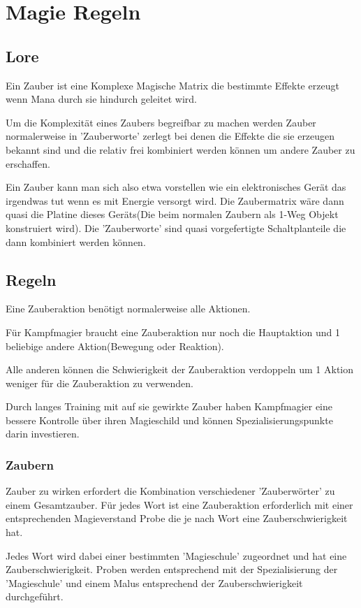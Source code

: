 \chapter{Magie Regeln}
\section{Lore}
Ein Zauber ist eine Komplexe Magische Matrix die bestimmte Effekte erzeugt wenn Mana durch sie hindurch geleitet wird.

Um die Komplexität eines Zaubers begreifbar zu machen werden Zauber normalerweise in 'Zauberworte' zerlegt bei denen die Effekte die sie erzeugen bekannt sind und die relativ frei kombiniert werden können um andere Zauber zu erschaffen.

Ein Zauber kann man sich also etwa vorstellen wie ein elektronisches Gerät das irgendwas tut wenn es mit Energie versorgt wird.
Die Zaubermatrix wäre dann quasi die Platine dieses Geräts(Die beim normalen Zaubern als 1-Weg Objekt konstruiert wird).
Die 'Zauberworte' sind quasi vorgefertigte Schaltplanteile die dann kombiniert werden können.

\section{Regeln}
\label{Kampfmagier}
Eine Zauberaktion benötigt normalerweise alle Aktionen.

Für Kampfmagier braucht eine Zauberaktion nur noch die Hauptaktion und 1 beliebige andere Aktion(Bewegung oder Reaktion).

Alle anderen können die Schwierigkeit der Zauberaktion verdoppeln um 1 Aktion weniger für die Zauberaktion zu verwenden.

Durch langes Training mit auf sie gewirkte Zauber haben Kampfmagier eine bessere Kontrolle über ihren Magieschild und können Spezialisierungspunkte darin investieren.

\subsection{Zaubern}
Zauber zu wirken erfordert die Kombination verschiedener 'Zauberwörter' zu einem Gesamtzauber.
Für jedes Wort ist eine Zauberaktion erforderlich mit einer entsprechenden Magieverstand Probe die je nach Wort eine Zauberschwierigkeit hat.

Jedes Wort wird dabei einer bestimmten 'Magieschule' zugeordnet und hat eine Zauberschwierigkeit. Proben werden entsprechend mit der Spezialisierung der 'Magieschule' und einem Malus entsprechend der Zauberschwierigkeit durchgeführt.

